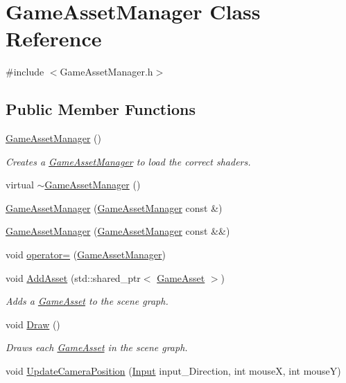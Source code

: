 \hypertarget{class_game_asset_manager}{}\section{Game\+Asset\+Manager Class Reference}
\label{class_game_asset_manager}


{\ttfamily \#include $<$Game\+Asset\+Manager.\+h$>$}

\subsection*{Public Member Functions}
\begin{DoxyCompactItemize}
\item 
\hyperlink{class_game_asset_manager_a84d0445928649e0d1e0f8e31ee137b17}{Game\+Asset\+Manager} ()
\begin{DoxyCompactList}\small\item\em Creates a \hyperlink{class_game_asset_manager}{Game\+Asset\+Manager} to load the correct shaders. \end{DoxyCompactList}\item 
virtual \hyperlink{class_game_asset_manager_a1270bd61ecbcca563f079803e40c9b77}{$\sim$\+Game\+Asset\+Manager} ()
\item 
\hyperlink{class_game_asset_manager_a2c9adcb72faa154c87eadc9bafe5269d}{Game\+Asset\+Manager} (\hyperlink{class_game_asset_manager}{Game\+Asset\+Manager} const \&)
\item 
\hyperlink{class_game_asset_manager_a44f6e2fd6b8ff1dd64e5697f1be7386d}{Game\+Asset\+Manager} (\hyperlink{class_game_asset_manager}{Game\+Asset\+Manager} const \&\&)
\item 
void \hyperlink{class_game_asset_manager_a7c9e4fce50b47b78652e7ff0b4dbb629}{operator=} (\hyperlink{class_game_asset_manager}{Game\+Asset\+Manager})
\item 
void \hyperlink{class_game_asset_manager_ad3de8ff00d55ba04728b1de8213b2349}{Add\+Asset} (std\+::shared\+\_\+ptr$<$ \hyperlink{class_game_asset}{Game\+Asset} $>$)
\begin{DoxyCompactList}\small\item\em Adds a \hyperlink{class_game_asset}{Game\+Asset} to the scene graph. \end{DoxyCompactList}\item 
void \hyperlink{class_game_asset_manager_a32837132bd70a9a9ed537323c2d3d886}{Draw} ()
\begin{DoxyCompactList}\small\item\em Draws each \hyperlink{class_game_asset}{Game\+Asset} in the scene graph. \end{DoxyCompactList}\item 
void \hyperlink{class_game_asset_manager_afbcf9d370cfefc67a696395f2cdf1a9b}{Update\+Camera\+Position} (\hyperlink{common_8h_a080a822f0093973313bd644e517a5090}{Input} input\+\_\+\+Direction, int mouse\+X, int mouse\+Y)
\end{DoxyCompactItemize}


